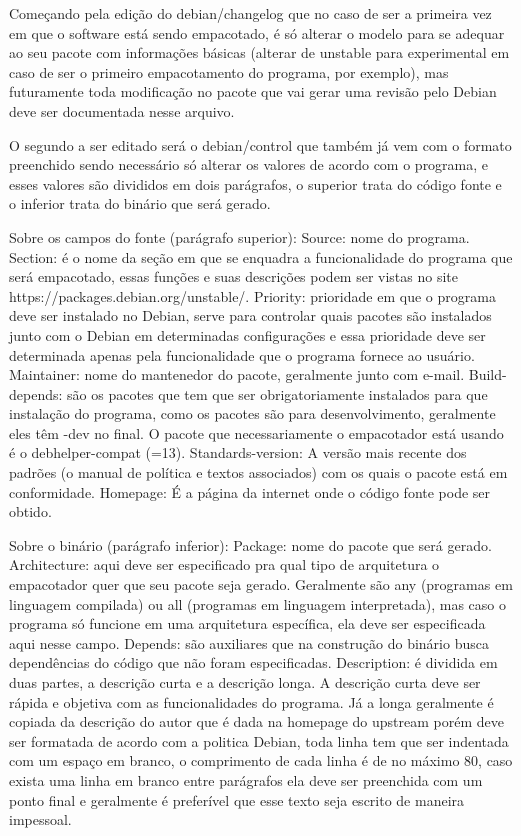 Começando pela edição do debian/changelog que no caso de ser a primeira vez em que o software está sendo empacotado, é só alterar o modelo para se adequar ao seu pacote com informações básicas (alterar de unstable para experimental em caso de ser o primeiro empacotamento do programa, por exemplo), mas futuramente toda modificação no pacote que vai gerar uma revisão pelo Debian deve ser documentada nesse arquivo. 

O segundo a ser editado será o debian/control que também já vem com o formato preenchido sendo necessário só alterar os valores de acordo com o programa, e esses valores são divididos em dois parágrafos, o superior trata do código fonte e o inferior trata do binário que será gerado.

Sobre os campos do fonte (parágrafo superior):
Source: nome do programa.
Section: é o nome da seção em que se enquadra a funcionalidade do programa que será empacotado, essas funções e suas descrições podem ser vistas no site https://packages.debian.org/unstable/.
Priority: prioridade em que o programa deve ser instalado no Debian, serve para controlar quais pacotes são instalados junto com o Debian em determinadas configurações e essa prioridade deve ser determinada apenas pela funcionalidade que o programa fornece ao usuário.
Maintainer: nome do mantenedor do pacote, geralmente junto com e-mail.
Build-depends: são os pacotes que tem que ser obrigatoriamente instalados para que instalação do programa, como os pacotes são para desenvolvimento, geralmente eles têm -dev no final. O pacote que necessariamente o empacotador está usando é o debhelper-compat (=13).
Standards-version: A versão mais recente dos padrões (o manual de política e textos associados) com os quais o pacote está em conformidade. 
Homepage: É a página da internet onde o código fonte pode ser obtido.

Sobre o binário (parágrafo inferior):
Package: nome do pacote que será gerado.
Architecture: aqui deve ser especificado pra qual tipo de arquitetura o empacotador quer que seu pacote seja gerado. Geralmente são any (programas em linguagem compilada) ou all (programas em linguagem interpretada), mas caso o programa só funcione em uma arquitetura específica, ela deve ser especificada aqui nesse campo.
Depends: são auxiliares que na construção do binário busca dependências do código que não foram especificadas. 
Description: é dividida em duas partes, a descrição curta e a descrição longa.
A descrição curta deve ser rápida e objetiva com as funcionalidades do programa. Já a longa geralmente é copiada da descrição do autor que é dada na homepage do upstream porém deve ser formatada de acordo com a politica Debian, toda linha tem que ser indentada com um espaço em branco, o comprimento de cada linha é de no máximo 80, caso exista uma linha em branco entre parágrafos ela deve ser preenchida com um ponto final e geralmente é preferível que esse texto seja escrito de maneira impessoal.

